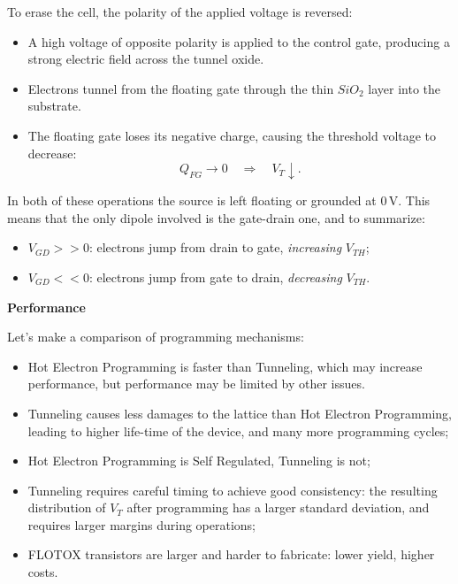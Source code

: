 \documentclass[a4paper,11pt]{article}
\begin{document}
To erase the cell, the polarity of the applied voltage is reversed:
\begin{itemize}
	\item A high voltage of opposite polarity is applied to the control
	      gate, producing a strong electric field across the tunnel oxide.

	\item Electrons tunnel from the floating gate through the thin
	      $SiO_2$ layer into the substrate.

	\item The floating gate loses its negative charge, causing the
	      threshold voltage to decrease:
	      \[
		      Q_{FG}\rightarrow 0 \quad\Rightarrow\quad V_T \downarrow.
	      \]
\end{itemize}

In both of these operations the source is left floating or grounded at $0 \, \mathrm{V}$.
This means that the only dipole involved is the gate-drain one, and to summarize:
\begin{itemize}
	\item $V_{GD} >> 0$: electrons jump from drain to gate, \textit{increasing} $V_{TH}$;
	\item $V_{GD} << 0$: electrons jump from gate to drain, \textit{decreasing} $V_{TH}$.
\end{itemize}

\par\smallskip
\textbf{\textsf{Performance}}

Let's make a comparison of programming mechanisms:
\begin{itemize}

	\item Hot Electron Programming is faster than Tunneling, which may increase performance, but performance may be limited by other issues.

	\item Tunneling causes less damages to the lattice than Hot Electron Programming, leading to higher life-time of the device, and many more programming cycles;

	\item Hot Electron Programming is Self Regulated, Tunneling is not;

	\item Tunneling requires careful timing to achieve good consistency:
	      the resulting distribution of $V_T$ after programming has a larger standard deviation,
	      and requires larger margins during operations;

	\item FLOTOX transistors are larger and harder to fabricate: lower yield, higher costs.
\end{itemize}
\end{document}
